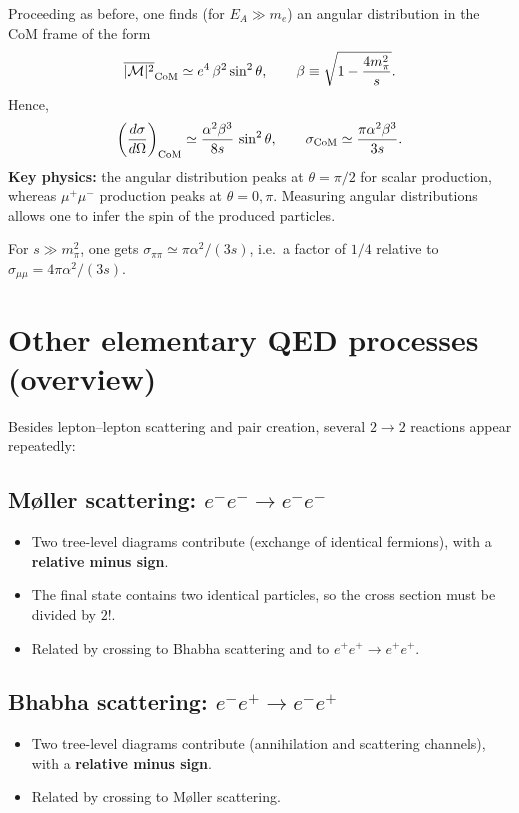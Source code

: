 Proceeding as before, one finds (for $E_A\gg m_e$) an angular distribution in the CoM frame of the form
\begin{equation}
\overline{|\mathcal{M}|^2}_{\rm CoM}
\simeq
e^4\,\beta^2\sin^2\theta,
\qquad
\beta \equiv \sqrt{1-\frac{4m_\pi^2}{s}}.
\end{equation}
Hence,
\begin{equation}
\left(\frac{d\sigma}{d\Omega}\right)_{\rm CoM}
\simeq
\frac{\alpha^2\beta^3}{8s}\,\sin^2\theta,
\qquad
\sigma_{\rm CoM}
\simeq
\frac{\pi\alpha^2\beta^3}{3s}.
\end{equation}
\textbf{Key physics:} the angular distribution peaks at $\theta=\pi/2$ for scalar production,
whereas $\mu^+\mu^-$ production peaks at $\theta=0,\pi$. Measuring angular distributions allows
one to infer the spin of the produced particles.

For $s\gg m_\pi^2$, one gets $\sigma_{\pi\pi}\simeq \pi\alpha^2/(3s)$, i.e.\ a factor of $1/4$
relative to $\sigma_{\mu\mu}=4\pi\alpha^2/(3s)$.

\section{Other elementary QED processes (overview)}
Besides lepton--lepton scattering and pair creation, several $2\to2$ reactions appear repeatedly:

\subsection{M{\o}ller scattering: $e^-e^- \to e^-e^-$}
\begin{itemize}
  \item Two tree-level diagrams contribute (exchange of identical fermions), with a \textbf{relative minus sign}.
  \item The final state contains two identical particles, so the cross section must be divided by $2!$.
  \item Related by crossing to Bhabha scattering and to $e^+e^+\to e^+e^+$.
\end{itemize}

\subsection{Bhabha scattering: $e^-e^+ \to e^-e^+$}
\begin{itemize}
  \item Two tree-level diagrams contribute (annihilation and scattering channels), with a \textbf{relative minus sign}.
  \item Related by crossing to M{\o}ller scattering.
\end{itemize}

